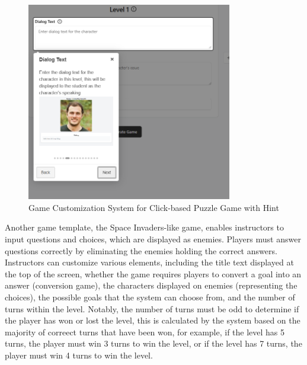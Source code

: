 \begin{figure}
	\centering
	\includegraphics[width=0.8\textwidth]{figures/Diagnose_Game/Instructor_Portal_Diagnose_Game_hint.png}
	\caption{Game Customization System for Click-based Puzzle Game with Hint}
	\label{fig:customizationClickPuzzleHint}
\end{figure}


Another game template, the Space Invaders-like game, enables instructors to input questions and choices, which are displayed as enemies. Players must answer questions correctly by eliminating the enemies holding the correct answers. Instructors can customize various elements, including the title text displayed at the top of the screen, whether the game requires players to convert a goal into an answer (conversion game), the characters displayed on enemies (representing the choices), the possible goals that the system can choose from, and the number of turns within the level. Notably, the number of turns must be odd to determine if the player has won or lost the level, this is calculated by the system based on the majority of correect turns that have been won, for example, if the level has 5 turns, the player must win 3 turns to win the level, or if the level has 7 turns, the player must win 4 turns to win the level.


